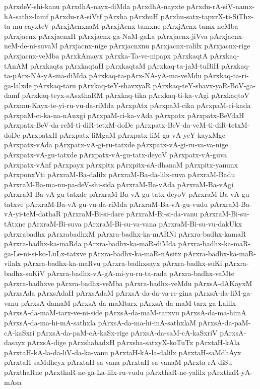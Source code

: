 {pArxdeV-shi-kanu
pArxdhA-nayx-diMda
pArxdhA-nayxte
pArxdu-rA-siV-namx-hA-sathx-lamf
pArxdu-rA-siVtf
pArxha
pArxhuH
pArxhu-satx-tapxrX-ti-SiThx-ta-mu-cayxteV
pArxjAcnxnaM
pArxjAcnx-tamxne
pArxjAcnx-tamx-neMba
pArxjacnx
pArxjacnxH
pArxjacnx-ga-NaM-gaLa
pArxjacnx-jiVva
pArxjacnx-neM-de-ni-suvaM
pArxjacnx-nige
pArxjacnxnu
pArxjacnx-ralilx
pArxjacnx-rige
pArxjacnx-veMba
pArxkAmayx
pArxka-Ta-ve-nipapx
pArxkaqtA
pArxkaq-tAnAM
pArxkaqta
pArxkaqtaH
pArxkaqtaM
pArxkaq-ta-jaM-tuBiH
pArxkaq-ta-pArx-NA-yA-ma-diMda
pArxkaq-ta-pArx-NA-yA-ma-veMdu
pArxkaq-ta-ri-ga-lalxde
pArxkaq-taru
pArxkaq-teY-shavxyaR
pArxkaq-teY-shavx-yaR-BoV-ga-damf
pArxkaq-teyx-sAsxthaRM
pArxkaq-tika
pArxkaq-ti-ka-vAgi
pArxkaqtoV
pArxmu-Kayx-te-yi-ru-vu-da-riMda
pArxpAtx
pArxpaM-cika
pArxpaM-ci-kada
pArxpaM-ci-ka-na-nAnxgi
pArxpaM-ci-ka-vAda
pArxpatx
pArxpatx-BeVdaH
pArxpatx-BeV-da-reM-ti-diR-tetxM-doDe
pArxpatx-BeV-da-veM-ti-diR-tetxM-doDe
pArxpatxH
pArxpatx-liMgaM
pArxpatx-liM-ga-vA-yeY-kayxMge
pArxpatx-vAda
pArxpatx-vA-gi-ru-tatxde
pArxpatx-vA-gi-ru-va-va-nige
pArxpatx-vA-gu-tatxde
pArxpatx-vA-gu-tatx-deyoV
pArxpatx-vA-guva
pArxpatx-vAnf
pArxpayx
pArxpitx
pArxpitx-sA-dhanaM
pArxpitx-yanunx
pArxponxVti
pArxraM-Ba-dalilx
pArxraM-Ba-da-lilx-ruva
pArxraM-Badu
pArxraM-Ba-ma-nu-pa-deV-shi-sida
pArxraM-Ba-vAda
pArxraM-Ba-vAgi
pArxraM-Ba-vA-gu-tatxde
pArxraM-Ba-vA-gu-tatx-deyoV
pArxraM-Ba-vA-gu-tatxve
pArxraM-Ba-vA-gu-vu-da-riMda
pArxraM-Ba-vA-gu-vudu
pArxraM-Ba-vA-yi-teM-dathaR
pArxraM-Bi-si-dare
pArxraM-Bi-si-da-vanu
pArxraM-Bi-su-tAtxne
pArxraM-Bi-suva
pArxraM-Bi-su-va-vana
pArxraM-Bi-su-vu-dakUkx
pArxrabadhx
pArxrabadhxM
pArxra-badhx-ka-mARNi
pArxra-badhx-kamaR
pArxra-badhx-ka-maRda
pArxra-badhx-ka-maR-diMda
pArxra-badhx-ka-maR-ga-Le-ni-si-ko-LuLx-tatxve
pArxra-badhx-ka-maR-nAsitx
pArxra-badhx-ka-maR-vilalx
pArxra-badhx-ka-maRvu
pArxra-badhxsayx
pArxra-badhx-suKi
pArxra-badhx-suKiV
pArxra-badhx-vA-gA-mi-yu-ru-ta-rada
pArxra-badhx-vaMte
pArxra-badhxve
pArxra-badhx-veMba
pArxra-badhx-veMdu
pArxsA-dAKayxM
pArxsAda
pArxsAdaH
pArxsAdaM
pArxsA-da-da-va-re-gina
pArxsA-da-liM-ga-vanu
pArxsA-damaM
pArxsA-da-maMtarx
pArxsA-da-maM-tarx-ga-Lalilx
pArxsA-da-maM-tarx-ve-ni-side
pArxsA-da-maM-tarxvu
pArxsA-da-ma-himA
pArxsA-da-ma-hi-mA-sathxla
pArxsA-da-ma-hi-mA-sathxlaM
pArxsA-da-paM-cA-kaSxri
pArxsA-da-paM-cA-kaSx-rige
pArxsA-da-saM-cA-kaSxriV
pArxsA-dasayx
pArxsA-dige
pArxshabadxH
pArxsha-satxyX-koTuTx
pArxtaH-kAla
pArxtaH-kA-la-da-liV-da-ka-vanu
pArxtaH-kA-la-dalilx
pArxtaH-saMdhAyx
pArxtaH-saMdheyx
pArxtaH-sa-vana
pArxtaH-sa-vanaM
pArxta-rA-diSu
pArxthaRne
pArxthaR-ne-ga-La-lilx-ru-vudu
pArxthaR-ne-yalilx
pArxthaR-yA-mAsa
}
